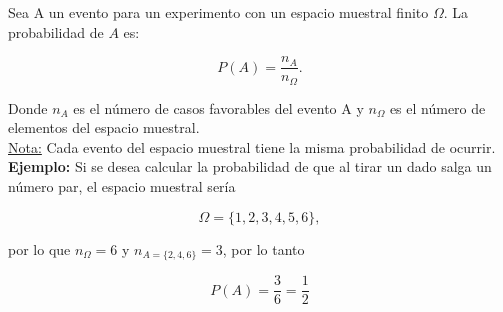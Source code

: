 \noindent Sea A un evento para un experimento con un espacio muestral finito $\Omega$. La probabilidad de $A$ es:

\begin{equation}
    P(A) = \frac{n_{A}}{n_{\Omega}}.
    \label{1.1.2 Probabilidad clásica}
\end{equation}

\noindent Donde $n_{A}$ es el número de casos favorables del evento A y $n_{\Omega}$ es el número de elementos del espacio muestral. \\

\noindent\underline{Nota:} Cada evento del espacio muestral tiene la misma probabilidad de ocurrir.\\

\noindent\textbf{Ejemplo: } Si se desea calcular la probabilidad de que al tirar un dado salga un número par, el espacio muestral sería 

\begin{equation*}
    \Omega = \{1,2,3,4,5,6\},
\end{equation*}

\noindent por lo que $n_{\Omega} = 6$ y $n_{A = \{2,4,6\}} = 3$, por lo tanto

\begin{equation*}
    P(A) = \frac{3}{6} = \frac{1}{2}
\end{equation*}